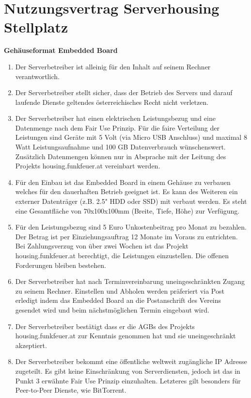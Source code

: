 \documentclass[parskip=half]{scrreprt}
\begin{document}
\small
\chapter*{Nutzungsvertrag Serverhousing Stellplatz}
\vspace{-0.8cm}
\textbf{Gehäuseformat Embedded Board\\}


\begin{contract}
\begin{enumerate}
\item Der Serverbetreiber ist alleinig für den Inhalt auf seinem Rechner verantwortlich.
\item Der Serverbetreiber stellt sicher, dass der Betrieb des Servers und darauf laufende Dienste geltendes österreichisches Recht nicht verletzen.
\item Der Serverbetreiber hat einen elektrischen Leistungsbezug und eine Datenmenge nach dem Fair Use Prinzip. Für die faire Verteilung der Leistungen sind Geräte mit 5 Volt (via Micro USB Anschluss) und maximal 8 Watt Leistungsaufnahme und 100 GB Datenverbrauch wünschenswert. Zusätzlich Datenmengen können nur in Absprache mit der Leitung des Projekts housing.funkfeuer.at vereinbart werden.
\item Für den Einbau ist das Embedded Board in einem Gehäuse zu verbauen welches für den dauerhaften Betrieb geeignet ist. Es kann des Weiteren ein externer Datenträger (z.B. 2.5" HDD oder SSD) mit verbaut werden. Es steht eine Gesamtfläche von 70x100x100mm (Breite, Tiefe, Höhe) zur Verfügung.
\item Für den Leistungsbezug sind 5 Euro Unkostenbeitrag pro Monat zu bezahlen. Der Betrag ist per Einziehungsauftrag 12 Monate im Voraus zu entrichten. Bei Zahlungsverzug von über zwei Wochen ist das Projekt housing.funkfeuer.at berechtigt, die Leistungen einzustellen. Die offenen Forderungen bleiben bestehen.
\item Der Serverbetreiber hat nach Terminvereinbarung uneingeschränkten Zugang zu seinem Rechner. Einstellen und Abholen werden präferiert via Post erledigt indem das Embedded Board an die Postanschrift des Vereins gesendet wird und beim nächstmöglichen Termin eingebaut wird.
\item Der Serverbetreiber bestätigt dass er die AGBs des Projekts housing.funkfeuer.at zur Kenntnis genommen hat und sie uneingeschränkt akzeptiert.
\item Der Serverbetreiber bekommt eine öffentliche weltweit zugängliche IP Adresse zugeteilt. Es gibt keine Einschränkung von Serverdiensten, jedoch ist das in Punkt 3 erwähnte Fair Use Prinzip einzuhalten. Letzteres gilt besonders für Peer-to-Peer Dienste, wie BitTorrent.

\end{enumerate}
\end{contract}
\end{document}

